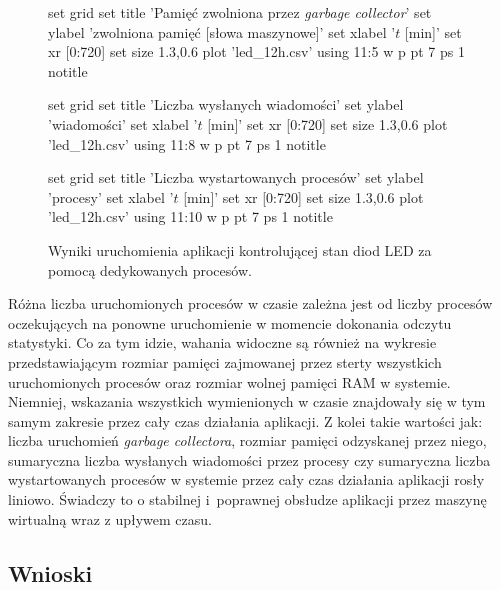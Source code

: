 \begin{figure}
\begin{gnuplot}[terminal=epslatex,terminaloptions=color]
	set grid
	set title 'Pamięć zwolniona przez \emph{garbage collector}'
	set ylabel 'zwolniona pamięć [słowa maszynowe]'
	set xlabel '$t$ [min]'
	set xr [0:720]
	set size 1.3,0.6
	plot 'led_12h.csv' using 11:5 w p pt 7 ps 1 notitle
\end{gnuplot}

\begin{gnuplot}[terminal=epslatex,terminaloptions=color]
	set grid
	set title 'Liczba wysłanych wiadomości'
	set ylabel 'wiadomości'
	set xlabel '$t$ [min]'
	set xr [0:720]
	set size 1.3,0.6
	plot 'led_12h.csv' using 11:8 w p pt 7 ps 1 notitle
\end{gnuplot}

\begin{gnuplot}[terminal=epslatex,terminaloptions=color]
	set grid
	set title 'Liczba wystartowanych procesów'
	set ylabel 'procesy'
	set xlabel '$t$ [min]'
	set xr [0:720]
	set size 1.3,0.6
	plot 'led_12h.csv' using 11:10 w p pt 7 ps 1 notitle
\end{gnuplot}

\caption{Wyniki uruchomienia aplikacji kontrolującej stan diod LED za pomocą dedykowanych procesów.}
\label{fig:ledGraphs}

\end{figure}

Różna liczba uruchomionych procesów w czasie zależna jest od liczby procesów oczekujących na ponowne uruchomienie w momencie dokonania odczytu statystyki.
Co za tym idzie, wahania widoczne są również na wykresie przedstawiającym rozmiar pamięci zajmowanej przez sterty wszystkich uruchomionych procesów oraz rozmiar wolnej pamięci RAM w systemie.
Niemniej, wskazania wszystkich wymienionych w czasie znajdowały się w tym samym zakresie przez cały czas działania aplikacji.
Z kolei takie wartości jak: liczba uruchomień \emph{garbage collectora}, rozmiar pamięci odzyskanej przez niego, sumaryczna liczba wysłanych wiadomości przez procesy czy sumaryczna liczba wystartowanych procesów w systemie przez cały czas działania aplikacji rosły liniowo.
Świadczy to o stabilnej i~poprawnej obsłudze aplikacji przez maszynę wirtualną wraz z upływem czasu.

\subsection{Wnioski}

